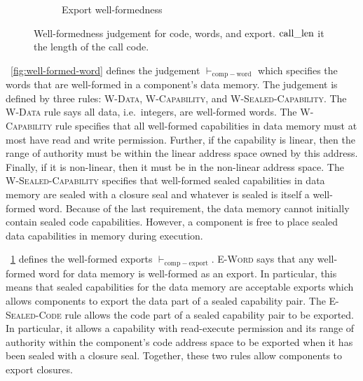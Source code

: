 \documentclass{jfp}
\newenvironment{jversion}{}{}
\begin{document}
\begin{jversion}
\begin{figure}
  \begin{subfigure}[h]{.8\linewidth}
    \caption{Export well-formedness}
    \label{fig:well-formed-export}
  \end{subfigure}
  \caption{Well-formedness judgement for code, words, and export. $\mathrm{call\_len}$ it the length of the call code.}
  \label{fig:well-formed-aux}
\end{figure}
\figurename~\ref{fig:well-formed-word} defines the judgement $\vdash_{\mathrm{comp-word}}$ which specifies the words that are well-formed in a component's data memory.
The judgement is defined by three rules: \textsc{W-Data}, \textsc{W-Capability}, and \textsc{W-Sealed-Capability}.
The \textsc{W-Data} rule says all data, i.e.\ integers, are well-formed words.
The \textsc{W-Capability} rule specifies that all well-formed capabilities in data memory must at most have read and write permission.
Further, if the capability is linear, then the range of authority must be within the linear address space owned by this address.
Finally, if it is non-linear, then it must be in the non-linear address space.
The \textsc{W-Sealed-Capability} specifies that well-formed sealed capabilities in data memory are sealed with a closure seal and whatever is sealed is itself a well-formed word.
Because of the last requirement, the data memory cannot initially contain sealed code capabilities.
However, a component is free to place sealed data capabilities in memory during execution.

\figurename~\ref{fig:well-formed-export} defines the well-formed exports $\vdash_{\mathrm{comp-export}}$.
\textsc{E-Word} says that any well-formed word for data memory is well-formed as an export.
In particular, this means that sealed capabilities for the data memory are acceptable exports which allows components to export the data part of a sealed capability pair.
The \textsc{E-Sealed-Code} rule allows the code part of a sealed capability pair to be exported.
In particular, it allows a capability with read-execute permission and its range of authority within the component's code address space to be exported when it has been sealed with a closure seal.
Together, these two rules allow components to export closures.


\end{jversion}
\end{document}
